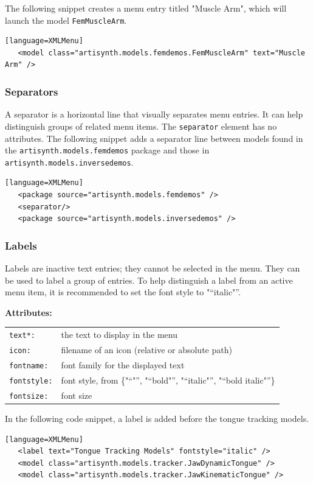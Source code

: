 \documentclass{article}
\newcommand{\openquot}{\iflatexml"\else``\fi}
\newcommand{\closequot}{\iflatexml"\else''\fi}
\newcommand{\quot}[1]{\openquot#1\closequot}
\begin{document}
The following snippet creates a menu entry titled "Muscle Arm", which will
launch the model {\tt FemMuscleArm}.
\begin{lstlisting}[][language=XMLMenu]
   <model class="artisynth.models.femdemos.FemMuscleArm" text="Muscle Arm" />
\end{lstlisting}

\subsubsection{Separators}

A separator is a horizontal line that visually separates menu entries.  It 
can help distinguish groups of related menu items.  The {\tt separator} element
has no attributes.  The following snippet adds a separator line between models
found in the {\tt artisynth.models.femdemos} package and those in 
{\tt artisynth.models.inversedemos}.
\begin{lstlisting}[][language=XMLMenu]
   <package source="artisynth.models.femdemos" />
   <separator/>
   <package source="artisynth.models.inversedemos" />
\end{lstlisting}

\subsubsection{Labels}

Labels are inactive text entries; they cannot be selected in the menu.  They
can be used to label a group of entries.  To help distinguish a label from an
active menu item, it is recommended to set the font style to \quot{italic}.

\noindent \textbf{Attributes:}\\
\begin{tabular}{ll}
   {\tt text*:} & the text to display in the menu\\
   {\tt icon:} & filename of an icon (relative or absolute path)\\
   {\tt fontname:} & font family for the displayed text\\
   {\tt fontstyle:} & font style, from \{\quot{}, \quot{bold}, \quot{italic},
      \quot{bold italic}\}\\
   {\tt fontsize:} & font size
\end{tabular}
\medskip

In the following code snippet, a label is added before the tongue tracking 
models.
\begin{lstlisting}[][language=XMLMenu]
   <label text="Tongue Tracking Models" fontstyle="italic" />
   <model class="artisynth.models.tracker.JawDynamicTongue" />
   <model class="artisynth.models.tracker.JawKinematicTongue" />
\end{lstlisting}
\end{document}
